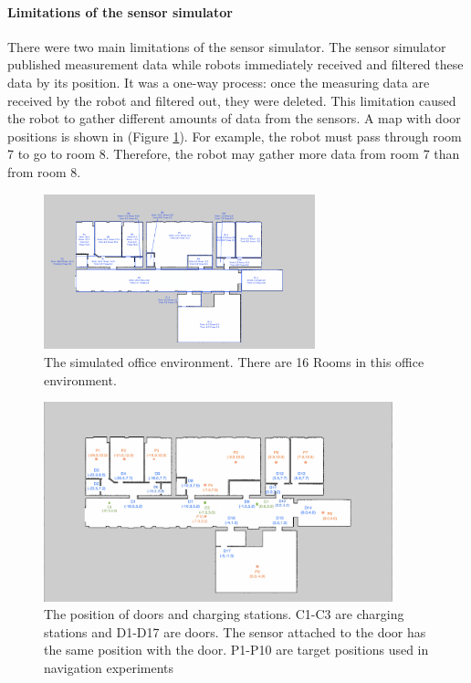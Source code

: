 \paragraph{Limitations of the sensor simulator}
There were two main limitations of the sensor simulator. The sensor simulator published measurement data while robots immediately received and filtered these data by its position. It was a one-way process: once the measuring data are received by the robot and filtered out, they were deleted.  This limitation caused the robot to gather different amounts of data from the sensors. A map with door positions is shown in (Figure \ref{fig:experiment_rooms}). For example, the robot must pass through room 7 to go to room 8. Therefore, the robot may gather more data from room 7 than from room 8.

\begin{figure}
 \centering
 \includegraphics[width = 0.7\textwidth]{content/images/ch1/room_division.png}
 \caption{The simulated office environment. There are 16 Rooms in this office environment.}
 \label{fig:experiment_rooms}
\end{figure}

\begin{figure}
 \centering
 \includegraphics[width = 0.9\textwidth]{content/images/ch5/door_station_points.png}
 \caption{The position of doors and charging stations. C1-C3 are charging stations and D1-D17 are doors. The sensor attached to the door has the same position with the door. P1-P10 are target positions used in navigation experiments}
 \label{fig:door_station}
 \end{figure}

